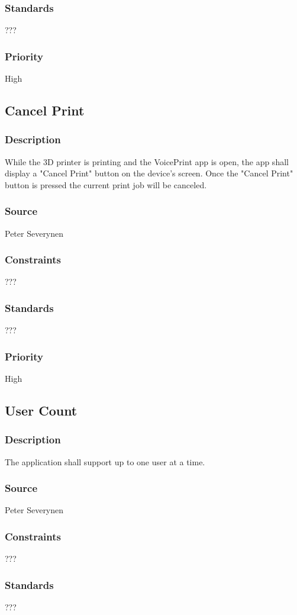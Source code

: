 \subsubsection{Standards}
???
\subsubsection{Priority}
High
\subsection{Cancel Print}
\subsubsection{Description}
While the 3D printer is printing and the VoicePrint app is open, the app shall display a "Cancel Print" button on the device's screen. Once the "Cancel Print" button is pressed the current print job will be canceled.
\subsubsection{Source}
Peter Severynen
\subsubsection{Constraints}
???
\subsubsection{Standards}
???
\subsubsection{Priority}
High
\subsection{User Count}
\subsubsection{Description}
The application shall support up to one user at a time.
\subsubsection{Source}
Peter Severynen
\subsubsection{Constraints}
???
\subsubsection{Standards}
???
